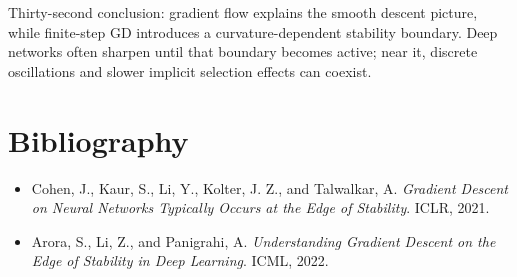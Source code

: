 \documentclass[11pt,a4paper,oneside,openany]{memoir}
\theoremstyle{definition}
\begin{document}
\begin{presentbox}
Thirty-second conclusion: gradient flow explains the smooth descent picture, while finite-step GD introduces a curvature-dependent stability boundary.  Deep networks often sharpen until that boundary becomes active; near it, discrete oscillations and slower implicit selection effects can coexist.
\end{presentbox}

\chapter*{Bibliography}
\begin{itemize}
\item Cohen, J., Kaur, S., Li, Y., Kolter, J. Z., and Talwalkar, A. \emph{Gradient Descent on Neural Networks Typically Occurs at the Edge of Stability}. ICLR, 2021.
\item Arora, S., Li, Z., and Panigrahi, A. \emph{Understanding Gradient Descent on the Edge of Stability in Deep Learning}. ICML, 2022.
\end{itemize}
\end{document}
